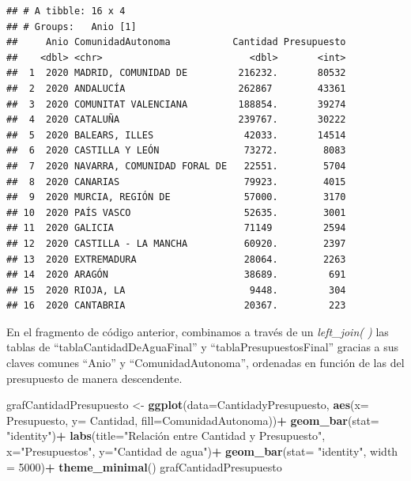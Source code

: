\documentclass[
]{article}
\newenvironment{Shaded}{\begin{snugshade}}{\end{snugshade}}
\newcommand{\AttributeTok}[1]{\textcolor[rgb]{0.13,0.29,0.53}{#1}}
\newcommand{\DecValTok}[1]{\textcolor[rgb]{0.00,0.00,0.81}{#1}}
\newcommand{\FunctionTok}[1]{\textcolor[rgb]{0.13,0.29,0.53}{\textbf{#1}}}
\newcommand{\NormalTok}[1]{#1}
\newcommand{\OtherTok}[1]{\textcolor[rgb]{0.56,0.35,0.01}{#1}}
\newcommand{\SpecialCharTok}[1]{\textcolor[rgb]{0.81,0.36,0.00}{\textbf{#1}}}
\newcommand{\StringTok}[1]{\textcolor[rgb]{0.31,0.60,0.02}{#1}}
\begin{document}
\begin{verbatim}
## # A tibble: 16 x 4
## # Groups:   Anio [1]
##     Anio ComunidadAutonoma           Cantidad Presupuesto
##    <dbl> <chr>                          <dbl>       <int>
##  1  2020 MADRID, COMUNIDAD DE         216232.       80532
##  2  2020 ANDALUCÍA                    262867        43361
##  3  2020 COMUNITAT VALENCIANA         188854.       39274
##  4  2020 CATALUÑA                     239767.       30222
##  5  2020 BALEARS, ILLES                42033.       14514
##  6  2020 CASTILLA Y LEÓN               73272.        8083
##  7  2020 NAVARRA, COMUNIDAD FORAL DE   22551.        5704
##  8  2020 CANARIAS                      79923.        4015
##  9  2020 MURCIA, REGIÓN DE             57000.        3170
## 10  2020 PAÍS VASCO                    52635.        3001
## 11  2020 GALICIA                       71149         2594
## 12  2020 CASTILLA - LA MANCHA          60920.        2397
## 13  2020 EXTREMADURA                   28064.        2263
## 14  2020 ARAGÓN                        38689.         691
## 15  2020 RIOJA, LA                      9448.         304
## 16  2020 CANTABRIA                     20367.         223
\end{verbatim}

En el fragmento de código anterior, combinamos a través de un
\emph{left\_join( )} las tablas de ``tablaCantidadDeAguaFinal'' y
``tablaPresupuestosFinal'' gracias a sus claves comunes ``Anio'' y
``ComunidadAutonoma'', ordenadas en función de las del presupuesto de
manera descendente.

\begin{Shaded}
\begin{Highlighting}[]
\NormalTok{grafCantidadPresupuesto }\OtherTok{\textless{}{-}} \FunctionTok{ggplot}\NormalTok{(}\AttributeTok{data=}\NormalTok{CantidadyPresupuesto, }\FunctionTok{aes}\NormalTok{(}\AttributeTok{x=}\NormalTok{ Presupuesto, }\AttributeTok{y=}\NormalTok{ Cantidad, }\AttributeTok{fill=}\NormalTok{ComunidadAutonoma))}\SpecialCharTok{+}
  \FunctionTok{geom\_bar}\NormalTok{(}\AttributeTok{stat=} \StringTok{"identity"}\NormalTok{)}\SpecialCharTok{+}
  \FunctionTok{labs}\NormalTok{(}\AttributeTok{title=}\StringTok{"Relación entre Cantidad y Presupuesto"}\NormalTok{,}
       \AttributeTok{x=}\StringTok{"Presupuestos"}\NormalTok{,}
       \AttributeTok{y=}\StringTok{"Cantidad de agua"}\NormalTok{)}\SpecialCharTok{+}
  \FunctionTok{geom\_bar}\NormalTok{(}\AttributeTok{stat=} \StringTok{"identity"}\NormalTok{, }\AttributeTok{width =} \DecValTok{5000}\NormalTok{)}\SpecialCharTok{+}
  \FunctionTok{theme\_minimal}\NormalTok{()}
\NormalTok{grafCantidadPresupuesto}
\end{Highlighting}
\end{Shaded}
\end{document}
